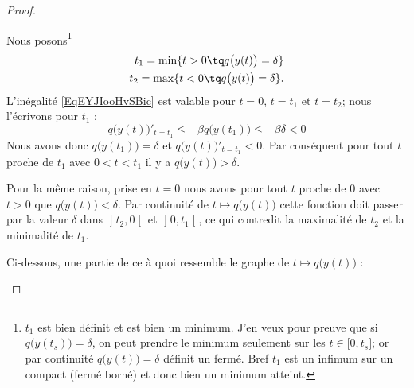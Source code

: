 \begin{proof}
\begin{subproof}
    Nous posons\footnote{\( t_1\) est bien définit et est bien un minimum. J'en veux pour preuve que si \( q\big( y(t_s) \big)=\delta\), on peut prendre le minimum seulement sur les \( t\in\mathopen[ 0 , t_s \mathclose]\); or par continuité \( q\big( y(t) \big)=\delta\) définit un fermé. Bref \( t_1\) est un infimum sur un compact (fermé borné) et donc bien un minimum atteint.}
    \begin{subequations}    \label{subeqsFNPJooERJkxO}
        \begin{align}
            t_1=\min\{ t>0\tq q\big( y(t) \big)=\delta \}\\
            t_2=\max\{ t<0\tq q\big( y(t) \big)=\delta \}.
        \end{align}
    \end{subequations}
    L'inégalité \eqref{EqEYJIooHvSBic} est valable pour \( t=0\), \( t=t_1\) et \( t=t_2\); nous l'écrivons pour \( t_1\) :
    \begin{equation}
        q\big( y(t) \big)'_{t=t_1}\leq-\beta q\big( y(t_1) \big)\leq-\beta \delta<0
    \end{equation}
    Nous avons donc \( q\big( y(t_1) \big)=\delta\) et \( q\big( y(t) \big)'_{t=t_1}<0\). Par conséquent pour tout \( t\) proche de \( t_1\) avec \( 0<t<t_1 \) il y a \( q\big( y(t) \big)>\delta\).


Pour la même raison, prise en \( t=0\) nous avons pour tout \( t\) proche de \( 0\) avec \( t>0\) que \( q\big( y(t) \big)<\delta\). Par continuité de \( t\mapsto q\big( y(t) \big)\) cette fonction doit passer par la valeur \( \delta\) dans \( \mathopen] t_2 , 0 \mathclose[\) et \( \mathopen] 0 , t_1 \mathclose[\), ce qui contredit la maximalité de \( t_2\) et la minimalité de \( t_1\).

    Ci-dessous, une partie de ce à quoi ressemble le graphe de \( t\mapsto q\big( y(t) \big)\) :
\begin{center}
   
\end{center}


\end{subproof}
\end{proof}
